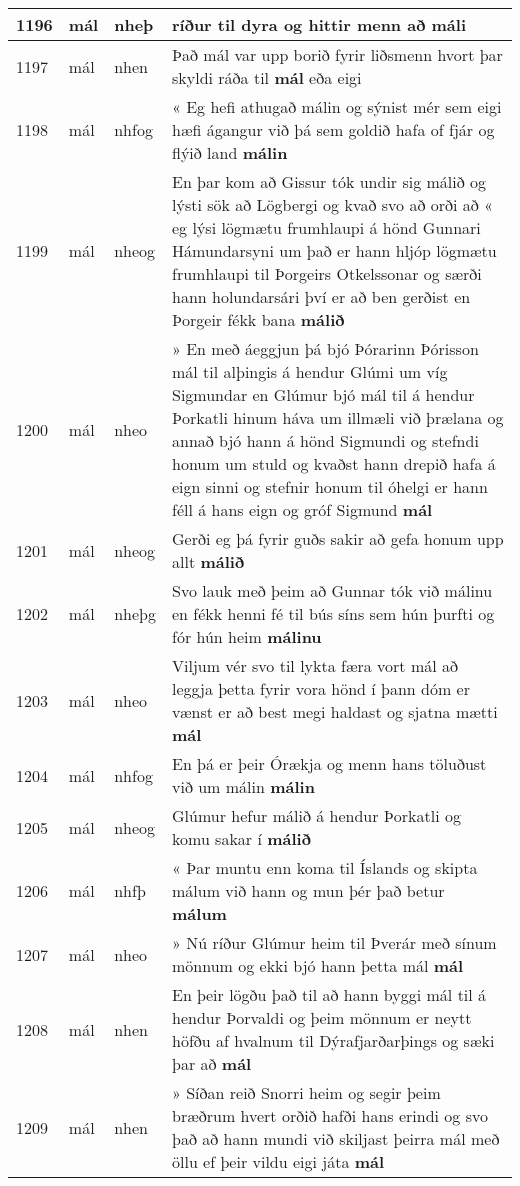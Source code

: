 \documentclass{article}
\begin{document}
\begin{longtable}{p{1cm}|p{1cm}|p{1cm}|p{13cm}}
\hline
1196&mál&nheþ&ríður til dyra og hittir menn að \textbf{máli} \\
\hline
1197&mál&nhen&Það mál var upp borið fyrir liðsmenn hvort þar skyldi ráða til \textbf{mál} eða eigi\\
\hline
1198&mál&nhfog&« Eg hefi athugað málin og sýnist mér sem eigi hæfi ágangur við þá sem goldið hafa of fjár og flýið land \textbf{málin} \\
\hline
1199&mál&nheog&En þar kom að Gissur tók undir sig málið og lýsti sök að Lögbergi og kvað svo að orði að « eg lýsi lögmætu frumhlaupi á hönd Gunnari Hámundarsyni um það er hann hljóp lögmætu frumhlaupi til Þorgeirs Otkelssonar og særði hann holundarsári því er að ben gerðist en Þorgeir fékk bana \textbf{málið} \\
\hline
1200&mál&nheo&» En með áeggjun þá bjó Þórarinn Þórisson mál til alþingis á hendur Glúmi um víg Sigmundar en Glúmur bjó mál til á hendur Þorkatli hinum háva um illmæli við þrælana og annað bjó hann á hönd Sigmundi og stefndi honum um stuld og kvaðst hann drepið hafa á eign sinni og stefnir honum til óhelgi er hann féll á hans eign og gróf Sigmund \textbf{mál} \\
\hline
1201&mál&nheog&Gerði eg þá fyrir guðs sakir að gefa honum upp allt \textbf{málið} \\
\hline
1202&mál&nheþg&Svo lauk með þeim að Gunnar tók við málinu en fékk henni fé til bús síns sem hún þurfti og fór hún heim \textbf{málinu} \\
\hline
1203&mál&nheo&Viljum vér svo til lykta færa vort mál að leggja þetta fyrir vora hönd í þann dóm er vænst er að best megi haldast og sjatna mætti \textbf{mál} \\
\hline
1204&mál&nhfog&En þá er þeir Órækja og menn hans töluðust við um málin \textbf{málin} \\
\hline
1205&mál&nheog&Glúmur hefur málið á hendur Þorkatli og komu sakar í \textbf{málið} \\
\hline
1206&mál&nhfþ&« Þar muntu enn koma til Íslands og skipta málum við hann og mun þér það betur \textbf{málum} \\
\hline
1207&mál&nheo&» Nú ríður Glúmur heim til Þverár með sínum mönnum og ekki bjó hann þetta mál \textbf{mál} \\
\hline
1208&mál&nhen&En þeir lögðu það til að hann byggi mál til á hendur Þorvaldi og þeim mönnum er neytt höfðu af hvalnum til Dýrafjarðarþings og sæki þar að \textbf{mál} \\
\hline
1209&mál&nhen&» Síðan reið Snorri heim og segir þeim bræðrum hvert orðið hafði hans erindi og svo það að hann mundi við skiljast þeirra mál með öllu ef þeir vildu eigi játa \textbf{mál} \\

\end{longtable}
\end{document}
